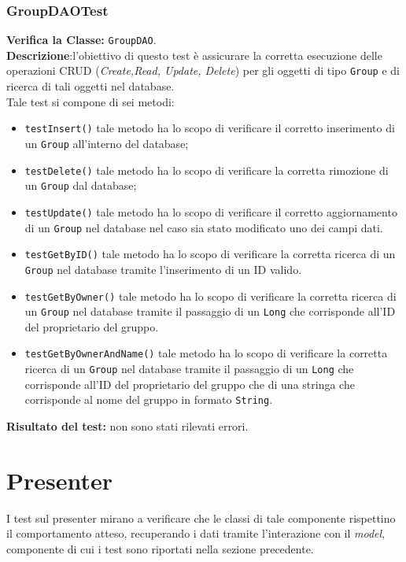 \subsubsection{GroupDAOTest}
\textbf{Verifica la Classe:} \texttt{GroupDAO}.\\
\textbf{Descrizione}:l'obiettivo di questo test è assicurare la corretta esecuzione delle operazioni CRUD (\textit{Create,Read, Update, Delete}) per gli oggetti di tipo \texttt{Group} e di ricerca di tali oggetti nel database. \\
Tale test si compone di sei metodi:
\begin{itemize}
\item \texttt{testInsert()} tale metodo ha lo scopo di verificare il corretto inserimento di un \texttt{Group} all'interno del database;
\item \texttt{testDelete()} tale metodo ha lo scopo di verificare la corretta rimozione di un \texttt{Group} dal database;
\item \texttt{testUpdate()} tale metodo ha lo scopo di verificare il corretto aggiornamento di un \texttt{Group} nel database nel caso sia stato modificato uno dei campi dati.
\item \texttt{testGetByID()} tale metodo ha lo scopo di verificare la corretta ricerca di un \texttt{Group} nel database tramite l'inserimento di un ID valido.
\item \texttt{testGetByOwner()} tale metodo ha lo scopo di verificare la corretta ricerca di un \texttt{Group} nel database tramite il passaggio di un \texttt{Long} che corrisponde all'ID del proprietario del gruppo.
\item \texttt{testGetByOwnerAndName()} tale metodo ha lo scopo di verificare la corretta ricerca di un \texttt{Group} nel database tramite il passaggio di un \texttt{Long} che corrisponde all'ID del proprietario del gruppo che di una stringa che corrisponde al nome del gruppo in formato \texttt{String}.
\end{itemize}
\textbf{Risultato del test:} non sono stati rilevati errori.


\section{Presenter}
I test sul presenter mirano a verificare che le classi di tale componente rispettino il comportamento atteso, recuperando i dati tramite l'interazione con il \textit{model}, componente di cui i test sono riportati nella sezione precedente.

